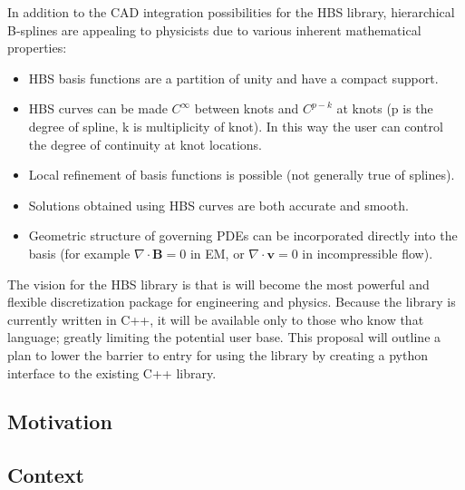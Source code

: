     In addition to the CAD integration possibilities for the HBS library, hierarchical B-splines are appealing to physicists due to various inherent mathematical properties:

    \begin{itemize}
      \item HBS basis functions are a partition of unity and have a compact support.
      \item HBS curves can be made $C^{\infty}$ between knots and $C^{p-k}$ at knots (p is the degree of spline, k is multiplicity of knot). In this way the user can control the degree of continuity at knot locations.
      \item Local refinement of basis functions is possible (not generally true of splines).
      \item Solutions obtained using HBS curves are both accurate and smooth.
      \item Geometric structure of governing PDEs can be incorporated directly into the basis (for example $\nabla\cdot\mathbf{B} = 0$ in EM, or $\nabla\cdot\mathbf{v} = 0$ in incompressible flow).
    \end{itemize}
    \mainstretch{}

    The vision for the HBS library is that is will become the most powerful and flexible discretization package for engineering and physics. Because the library is currently written in C++, it will be available only to those who know that language; greatly limiting the potential user base. This proposal will outline a plan to lower the barrier to entry for using the library by creating a python interface to the existing C++ library.

  \subsection{Motivation} \label{ssec:motivation}

    \blindtext


  \subsection{Context} \label{ssec:context}

    \blindtext
